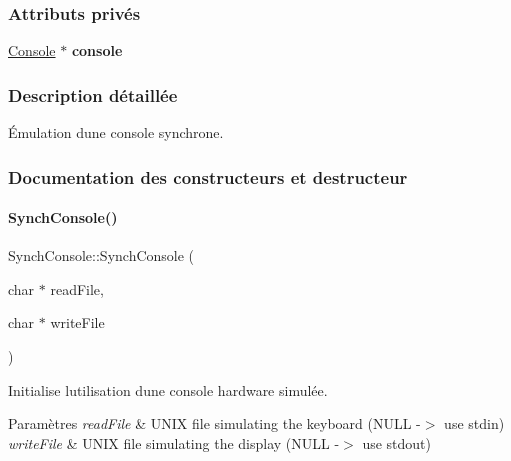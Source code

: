 \subsubsection*{Attributs privés}
\begin{DoxyCompactItemize}
\item 
\hypertarget{class_synch_console_a5076e225db5a11078e57f63512e3d77a}{}\label{class_synch_console_a5076e225db5a11078e57f63512e3d77a} 
\hyperlink{class_console}{Console} $\ast$ {\bfseries console}
\end{DoxyCompactItemize}


\subsubsection{Description détaillée}
Émulation d\textquotesingle{}une console synchrone. 

\subsubsection{Documentation des constructeurs et destructeur}
\hypertarget{class_synch_console_a888915fb5c11051308853603ccf0e436}{}\label{class_synch_console_a888915fb5c11051308853603ccf0e436} 
\paragraph{\texorpdfstring{Synch\+Console()}{SynchConsole()}}
{\footnotesize\ttfamily Synch\+Console\+::\+Synch\+Console (\begin{DoxyParamCaption}\item[{char $\ast$}]{read\+File,  }\item[{char $\ast$}]{write\+File }\end{DoxyParamCaption})}



Initialise l\textquotesingle{}utilisation d\textquotesingle{}une console hardware simulée. 


\begin{DoxyParams}{Paramètres}
{\em read\+File} & U\+N\+IX file simulating the keyboard (N\+U\+LL -\/$>$ use stdin) \\
\hline
{\em write\+File} & U\+N\+IX file simulating the display (N\+U\+LL -\/$>$ use stdout) \\
\hline
\end{DoxyParams}


